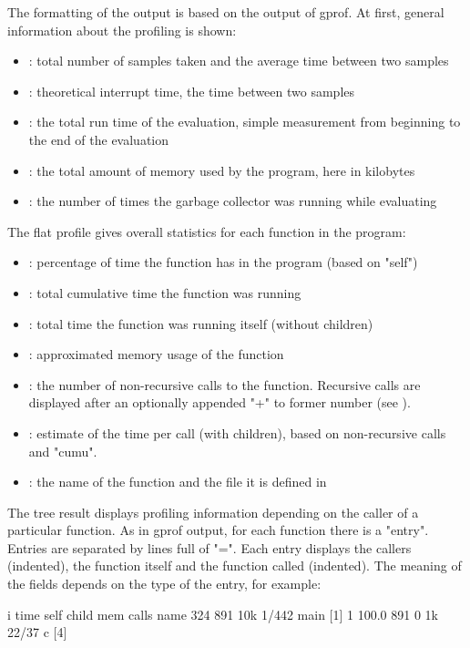 The formatting of the output is based on the output of gprof.
At first, general information about the profiling is shown:
\begin{itemize}
	\item {}: total number of samples taken and the
		average time between two samples
	\item {}: theoretical interrupt time, the time between
		two samples
	\item {}: the total run time of the evaluation, simple measurement
		from beginning to the end of the evaluation
	\item {}: the total amount of memory used by the program, here in kilobytes
	\item {}: the number of times the garbage collector was running while evaluating
\end{itemize}

The flat profile gives overall statistics for each function in the program:
\begin{itemize}
\item {}:
	percentage of time the function has in the program (based on "self")
\item {}:
	total cumulative time the function was running
\item {}:
	total time the function was running itself (without children)
\item {}:
	approximated memory usage of the function
\item {}:
	the number of non-recursive calls to the function. Recursive calls are displayed after an
	optionally appended "+" to former number (see ).
\item {}:
	estimate of the time per call (with children), based on non-recursive calls and "cumu".
\item {}:
	the name of the function and the file it is defined in
\end{itemize}

The tree result displays profiling information depending on the caller of a particular function.
As in gprof output, for each function there is a "entry". Entries are separated by lines full of "=".
Each entry displays the callers (indented), the function itself and the function called (indented).
The meaning of the fields depends on the type of the entry, for example:

\begin{example}
 i    time self  child  mem    calls   name
            324    891  10k    1/442      main [1]
 1  100.0%
            891      0   1k    22/37      c [4]
\end{example}

